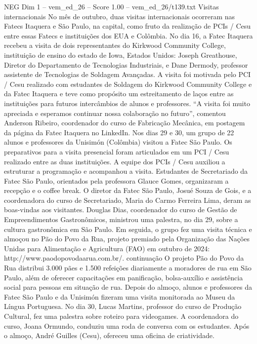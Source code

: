 \begin{textsample}{NEG Dim 1 – vem\_ed\_26 – Score 1.00 – vem\_ed\_26/t139.txt}  \label{ex:f1_neg_044}
Visitas internacionais No mês de outubro, duas visitas internacionais ocorreram nas Fatecs Itaquera e São Paulo, na capital, como fruto da realização de PCIs / Cesu entre essas Fatecs e instituições dos EUA e Colômbia.
No dia 16, a Fatec Itaquera recebeu a visita de dois representantes do Kirkwood Community College, instituição de ensino do estado de Iowa, Estados Unidos: Joseph Greathouse, Diretor do Departamento de Tecnologias Industriais, e Dane Dermody, professor assistente de Tecnologias de Soldagem Avançadas.
A visita foi motivada pelo PCI / Cesu realizado com estudantes de Soldagem do Kirkwood Community College e da Fatec Itaquera e teve como propósito um estreitamento de laços entre as instituições para futuros intercâmbios de alunos e professores. “A visita foi muito apreciada e esperamos continuar nossa colaboração no futuro”, comentou Anderson Ribeiro, coordenador do curso de Fabricação Mecânica, em postagem da página da Fatec Itaquera no LinkedIn.
Nos dias 29 e 30, um grupo de 22 alunos e professores da Unisimón (Colômbia) visitou a Fatec São Paulo.
Os preparativos para a visita presencial foram articulados em um PCI / Cesu realizado entre as duas instituições.
A equipe dos PCIs / Cesu auxiliou a estruturar a programação e acompanhou a visita.
Estudantes de Secretariado da Fatec São Paulo, orientados pela professora Glauce Gomes, organizaram a recepção e o coffee break.
O diretor da Fatec São Paulo, Josué Souza de Gois, e a coordenadora do curso de Secretariado, Maria do Carmo Ferreira Lima, deram as boas-vindas aos visitantes.
Douglas Dias, coordenador do curso de Gestão de Empreendimentos Gastronômicos, ministrou uma palestra, no dia 29, sobre a cultura gastronômica em São Paulo.
Em seguida, o grupo fez uma visita técnica e almoçou no Pão do Povo da Rua, projeto premiado pela Organização das Nações Unidas para Alimentação e Agricultura (FAO) em outubro de 2024: http://www.paodopovodaarua.com.br/. continuação O projeto Pão do Povo da Rua distribui 3.000 pães e 1.500 refeições diariamente a moradores de rua em São Paulo, além de oferecer capacitações em panificação, bolsa-auxílio e assistência social para pessoas em situação de rua.
Depois do almoço, alunos e professores da Fatec São Paulo e da Unisimón fizeram uma visita monitorada ao Museu da Língua Portuguesa.
No dia 30, Lucas Martins, professor do curso de Produção Cultural, fez uma palestra sobre roteiro para videogames.
A coordenadora do curso, Joana Ormundo, conduziu uma roda de conversa com os estudantes.
Após o almoço, André Guilles (Cesu), ofereceu uma oficina de criatividade.

\end{textsample}
